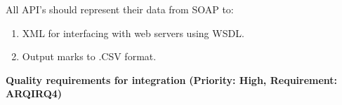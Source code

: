 \documentclass[12pt]{article}
\begin{document}
	All API's should represent their data from SOAP to:
	\begin{enumerate}
					\item XML for interfacing with web servers using WSDL.
					\item Output marks to .CSV format.					
	\end{enumerate}
		
		\vspace{0.15in}
			

	
\begin{flushleft}
				\textbf{Quality requirements for integration}
				\newline\textbf{(Priority: High, Requirement: ARQIRQ4)}
\end{flushleft}		

		
		\vspace{0.05in}
			
\end{document}
